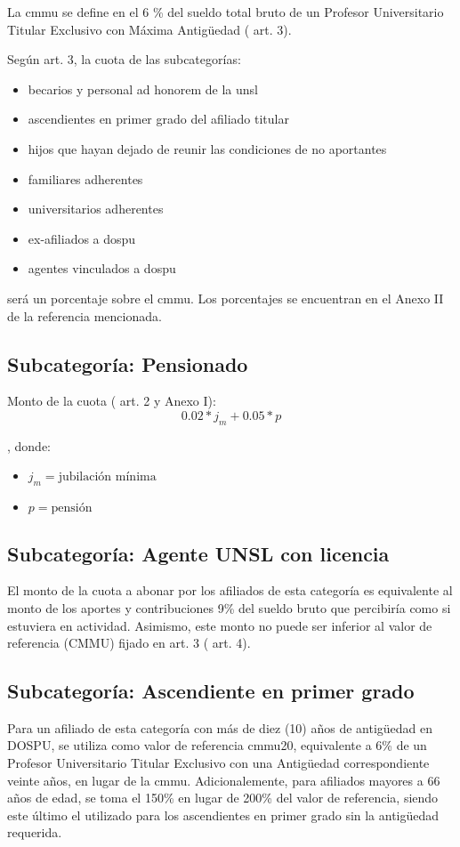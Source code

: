 La \acrfull{cmmu} se define en el 6 \% del sueldo total bruto de un Profesor Universitario Titular Exclusivo con Máxima Antigüedad (\cite{dospuRes21} art. 3).

Según \cite{dospuRes21} art. 3, la cuota de las subcategorías:
\begin{itemize}
    \item becarios y personal ad honorem de la unsl
    \item ascendientes en primer grado del afiliado titular
    \item hijos que hayan dejado de reunir las condiciones de no aportantes
    \item familiares adherentes
    \item universitarios adherentes
    \item ex-afiliados a \acrshort{dospu} 
    \item agentes vinculados a \acrshort{dospu}
\end{itemize}
será un porcentaje sobre el \acrshort{cmmu}. Los porcentajes se encuentran en el Anexo II de la referencia mencionada.

\subsection{Subcategoría: Pensionado}
Monto de la cuota (\cite{dospuRes21} art. 2 y Anexo I): $$0.02 * j_m + 0.05 * p$$

, donde:
\begin{itemize}
    \item $j_m = \text{jubilación mínima}$
    \item $p = \text{pensión}$
\end{itemize}

\subsection{Subcategoría: Agente UNSL con licencia}
El monto de la cuota a abonar por los afiliados de esta categoría es equivalente al monto de los aportes y contribuciones 9\% del sueldo bruto que percibiría como si estuviera en actividad. Asimismo, este monto no puede ser inferior al valor de referencia (CMMU) fijado en \cite{dospuRes21} art. 3 (\cite{dospuRes21} art. 4).

\subsection{Subcategoría: Ascendiente en primer grado}
Para un afiliado de esta categoría con más de diez (10) años de antigüedad en DOSPU, se utiliza como valor de referencia \acrshort{cmmu}20, equivalente a 6\% de un Profesor Universitario Titular Exclusivo con una Antigüedad correspondiente veinte años, en lugar de la \acrshort{cmmu}\cite{dospuRes60}.
Adicionalemente, para afiliados mayores a 66 años de edad, se toma el 150\% en lugar de 200\% del valor de referencia, siendo este último el utilizado para los ascendientes en primer grado sin la antigüedad requerida.

